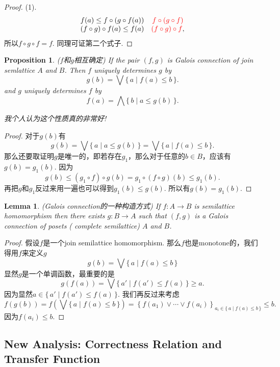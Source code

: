\documentclass{article}
\newtheorem{lemma}[theorem]{Lemma}
\newtheorem{proposition}[theorem]{Proposition}
\newcommand*{\xfunc}[4]{{#2}\colon{#3}{#1}{#4}}
\newcommand*{\func}[3]{\xfunc{\to}{#1}{#2}{#3}}
\newcommand\Set[2]{\{\,#1\mid#2\,\}} %
\begin{document}
\begin{proof}
(1).
$$
\begin{array}{cc}
 f(a) \leq  f \circ (g \circ f(a)) & {\color{red} f \circ( g \circ f)} \\
 (f\circ g) \circ f(a) \leq f(a) & {\color{red}(f \circ g) \circ f}, \\
\end{array}
$$
所以$f \circ g \circ f  = f$. 同理可证第二个式子.
\end{proof}

\begin{proposition}
\rm {\color{red} ($f$和$g$相互确定)} If the pair $(f,g)$ is Galois connection of join semlattice $A$ and $B$. Then $f$ uniquely determines $g$ by
$$
g(b) = \bigvee\Set{a}{f(a) \leq b}.
$$
and $g$ uniquely determines $f$ by
$$
f(a) = \bigwedge\Set{b}{a \leq g(b)}.
$$

{\color{blue} 我个人认为这个性质真的非常好}!
\end{proposition}


\begin{proof}
对于$g(b)$有
$$
g(b) = \bigvee\Set{a}{a \leq g(b)} = \bigvee\Set{a}{f(a) \leq b}.
$$
那么还要取证明$g$是唯一的，即若存在$g_1$，那么对于任意的$b \in B$，应该有$g(b) = g_1(b)$. 因为
$$
g(b) \leq (g_1\circ f)\circ g(b) = g_1 \circ (f \circ g)(b) \leq g_1(b). 
$$
再把$g$和$g_1$反过来用一遍也可以得到$g_1(b) \leq g(b)$. 所以有$g(b) = g_1(b)$.
\end{proof}

\begin{lemma}
\rm {\color{red} (Galois connection的一种构造方式)} If $\func{f}{A}{B}$ is semilattice homomorphism then there exists $\func{g}{B}{A}$ such that $(f,g)$ is a Galois connection of posets ({\color{red} complete semilattice}) $A$ and $B$.
\end{lemma}

\begin{proof}
假设$f$是一个join semilattice homomorphism. 那么$f$也是monotone的，我们得用$f$来定义$g$
$$
g(b) = \bigvee\Set{a}{f(a) \leq b}
$$
显然$g$是一个单调函数，最重要的是
$$
g(f(a)) = \bigvee\Set{a'}{f(a') \leq f(a)} \geq a .
$$
因为显然$a \in \Set{a'}{f(a') \leq f(a)}$. 我们再反过来考虑
$$
f(g(b)) = f(\bigvee\Set{a}{f(a) \leq b}) = \left\{f(a_1)\vee \cdots \vee f(a_i)\right\}_{a_i \in \Set{a}{f(a) \leq b}} \leq b.
$$
因为$f(a_i) \leq b$.
\end{proof}

\newpage
\subsection{New Analysis: Correctness Relation and Transfer Function}
\end{document}
